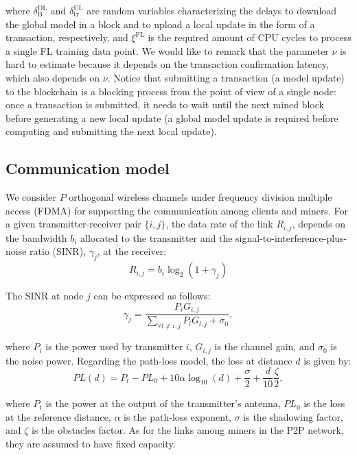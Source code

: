 \documentclass[lettersize,journal]{IEEEtran}
\begin{document}
where $\delta_{\text{B}}^\text{DL}$ and $\delta_{\text{tr}}^\text{UL}$ are random variables characterizing the delays to download the global model in a block and to upload a local update in the form of a transaction, respectively, and $\xi^\text{FL}$ is the required amount of CPU cycles to process a single FL training data point. We would like to remark that the parameter $\nu$ is hard to estimate because it depends on the transaction confirmation latency, which also depends on $\nu$. Notice that submitting a transaction (a model update) to the blockchain is a blocking process from the point of view of a single node: once a transaction is submitted, it needs to wait until the next mined block before generating a new local update (a global model update is required before computing and submitting the next local update).

\subsection{Communication model}
\label{section:comm_model}
We consider $P$ orthogonal wireless channels under frequency division multiple access (FDMA) for supporting the communication among clients and miners. For a given transmitter-receiver pair $\{i,j\}$, the data rate of the link $R_{i,j}$, depends on the bandwidth $b_{i}$ allocated to the transmitter and the signal-to-interference-plus-noise ratio (SINR), $\gamma_{j}$, at the receiver:   
\begin{equation}
R_{i,j} = b_i \log_2(1 + \gamma_j)
\end{equation}

The SINR at node $j$ can be expressed as follows:
\begin{equation}
\gamma_j = \frac{P_{i}G_{i,j}}{\sum_{\forall l \neq i,j}P_l G_{l,j} +\sigma_0},
\end{equation}

where $P_{i}$ is the power used by transmitter $i$, $G_{i,j}$ is the channel gain, and $\sigma_0$ is the noise power. Regarding the path-loss model, the loss at distance $d$ is given by:%
\begin{equation}
PL(d) = P_t-PL_0+10 \alpha \log_{10}(d) + \frac{\sigma}{2} + \frac{d}{10} \frac{\zeta}{2},
\end{equation}

where $P_t$ is the power at the output of the transmitter's antenna, $PL_0$ is the loss at the reference distance, $\alpha$ is the path-loss exponent, $\sigma$ is the shadowing factor, and $\zeta$ is the obstacles factor. As for the links among miners in the P2P network, they are assumed to have fixed capacity.
\end{document}
